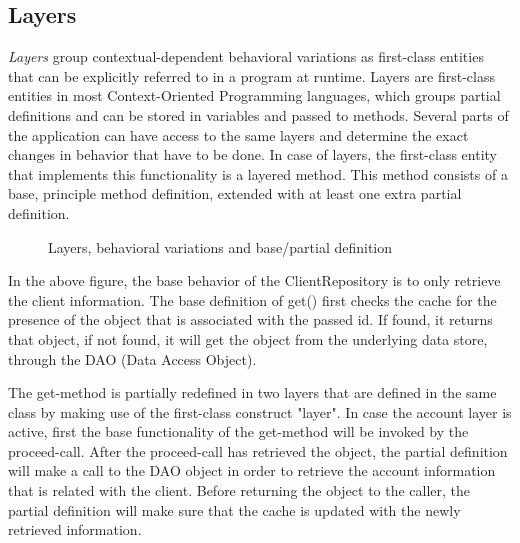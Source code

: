 \documentclass{acm_proc_article-sp}
\begin{document}
\subsection{Layers}
\label{sec:layers}
\textit{Layers} group contextual-dependent behavioral variations as first-class entities that can be explicitly referred to in a program at runtime. Layers are first-class entities in most Context-Oriented Programming languages, which groups partial definitions and can be stored in variables and passed to methods. Several parts of the application can have access to the same layers and determine the exact changes in behavior that have to be done. In case of layers, the first-class entity that implements this functionality is a layered method. This method consists of a base, principle method definition, extended with at least one extra partial definition.

\begin{figure}[H]
\centering
{}
\caption{Layers, behavioral variations and base/partial definition}
\label{fig:layers}
\end{figure}

In the above figure, the base behavior of the ClientRepository is to only retrieve the client information. The base definition of get() first checks the cache for the presence of the object that is associated with the passed id. If found, it returns that object, if not found, it will get the object from the underlying data store, through the DAO (Data Access Object). 

The get-method is partially redefined in two layers that are defined in the same class by making use of the first-class construct "layer". In case the account layer is active, first the base functionality of the get-method will be invoked by the proceed-call. After the proceed-call has retrieved the object, the partial definition will make a call to the DAO object in order to retrieve the account information that is related with the client. Before returning the object to the caller, the partial definition will make sure that the cache is updated with the newly retrieved information. 
\end{document}
